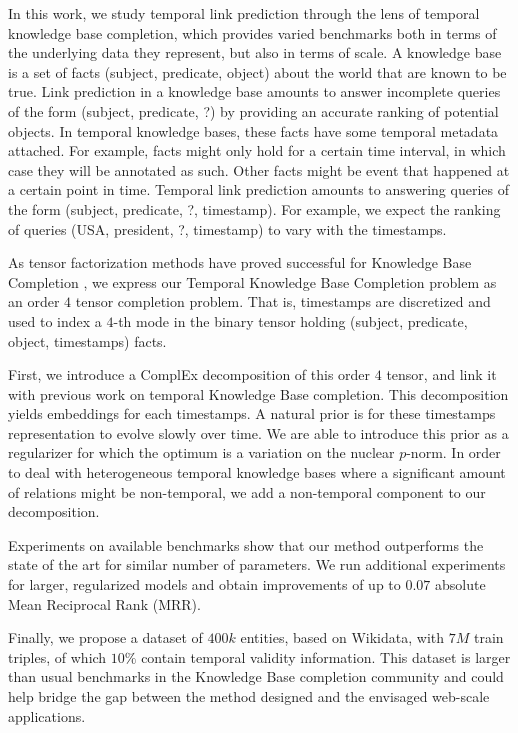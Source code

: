 \documentclass{article}
\begin{document}
In this work, we study temporal link prediction through the lens of temporal knowledge base completion, which provides varied benchmarks both in terms of the underlying data they represent, but also in terms of scale. A knowledge base is a set of facts (subject, predicate, object) about the world that are known to be true. Link prediction in a knowledge base amounts to answer incomplete queries of the form (subject, predicate, ?) by providing an accurate ranking of potential objects. In temporal knowledge bases, these facts have some temporal metadata attached. For example, facts might only hold for a certain time interval, in which case they will be annotated as such. Other facts might be event that happened at a certain point in time. Temporal link prediction amounts to answering queries of the form (subject, predicate, ?, timestamp). For example, we expect the ranking of queries (USA, president, ?, timestamp) to vary with the timestamps.





As tensor factorization methods have proved successful for Knowledge Base Completion \citep{nickel_review_2016, trouillon_complex_2016, lacroix2018canonical}, we express our Temporal Knowledge Base Completion problem as an order $4$ tensor completion problem. That is, timestamps are discretized and used to index a $4$-th mode in the binary tensor holding (subject, predicate, object, timestamps) facts.

First, we introduce a ComplEx \citep{trouillon_complex_2016} decomposition of this order $4$ tensor, and link it with previous work on temporal Knowledge Base completion. This decomposition yields embeddings for each timestamps. A natural prior is for these timestamps representation to evolve slowly over time. We are able to introduce this prior as a regularizer for which the optimum is a variation on the nuclear $p$-norm. In order to deal with heterogeneous temporal knowledge bases where a significant amount of relations might be non-temporal, we add a non-temporal component to our decomposition.

Experiments on available benchmarks show that our method outperforms the state of the art for similar number of parameters. We run additional experiments for larger, regularized models and obtain improvements of up to $0.07$ absolute Mean Reciprocal Rank (MRR).  

Finally, we propose a dataset of $400k$ entities, based on Wikidata, with $7M$ train triples, of which $10\%$ contain temporal validity information. This dataset is larger than usual benchmarks in the Knowledge Base completion community and could help bridge the gap between the method designed and the envisaged web-scale applications.
\end{document}
